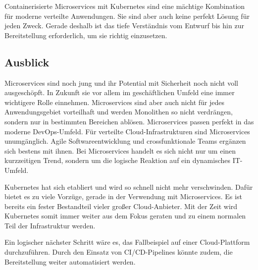 Containerisierte Microservices mit Kubernetes sind eine mächtige Kombination für moderne verteilte Anwendungen. Sie sind aber auch keine perfekt Lösung für jeden Zweck. Gerade deshalb ist das tiefe Verständnis vom Entwurf bis hin zur Bereitstellung erforderlich, um sie richtig einzusetzen.

\subsection{Ausblick}

Microservices sind noch jung und ihr Potential mit Sicherheit noch nicht voll ausgeschöpft. In Zukunft sie vor allem im geschäftlichen Umfeld eine immer wichtigere Rolle einnehmen. Microservices sind aber auch nicht für jedes Anwendungsgebiet vorteilhaft und werden Monolithen so nicht verdrängen, sondern nur in bestimmten Bereichen ablösen. Microservices passen perfekt in das moderne DevOps-Umfeld. Für verteilte Cloud-Infrastrukturen sind Microservices unumgänglich. Agile Softwareentwicklung und crossfunktionale Teams ergänzen sich bestens mit ihnen. Bei Microservices handelt es sich nicht nur um einen kurzzeitigen Trend, sondern um die logische Reaktion auf ein dynamisches IT-Umfeld.

Kubernetes hat sich etabliert und wird so schnell nicht mehr verschwinden. Dafür bietet es zu viele Vorzüge, gerade in der Verwendung mit Microservices. Es ist bereits ein fester Bestandteil vieler großer Cloud-Anbieter. Mit der Zeit wird Kubernetes somit immer weiter aus dem Fokus geraten und zu einem normalen Teil der Infrastruktur werden.

Ein logischer nächster Schritt wäre es, das Fallbeispiel auf einer Cloud-Plattform durchzuführen. Durch den Einsatz von CI/CD-Pipelines könnte zudem, die Bereitstellung weiter automatisiert werden.
